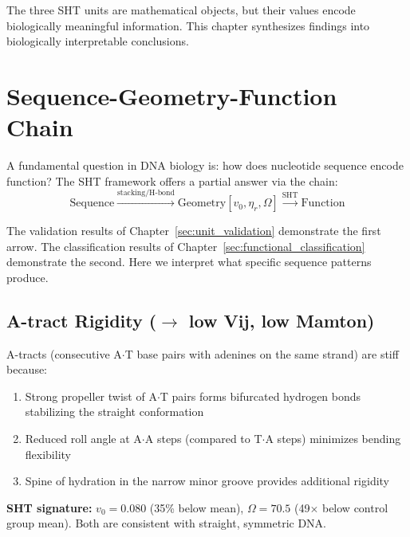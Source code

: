

The three SHT units are mathematical objects, but their values encode biologically meaningful information. This chapter synthesizes findings into biologically interpretable conclusions.

\section{Sequence-Geometry-Function Chain}

A fundamental question in DNA biology is: how does nucleotide sequence encode function? The SHT framework offers a partial answer via the chain:
\begin{equation}
    \text{Sequence} \xrightarrow{\text{stacking/H-bond}} \text{Geometry}[v_0, \eta_r, \Omega] \xrightarrow{\text{SHT}} \text{Function}
\end{equation}

The validation results of Chapter~\ref{sec:unit_validation} demonstrate the first arrow. The classification results of Chapter~\ref{sec:functional_classification} demonstrate the second. Here we interpret what specific sequence patterns produce.

\subsection{A-tract Rigidity ($\rightarrow$ low Vij, low Mamton)}

A-tracts (consecutive A$\cdot$T base pairs with adenines on the same strand) are stiff because:
\begin{enumerate}
    \item Strong propeller twist of A$\cdot$T pairs forms bifurcated hydrogen bonds stabilizing the straight conformation
    \item Reduced roll angle at A$\cdot$A steps (compared to T$\cdot$A steps) minimizes bending flexibility
    \item Spine of hydration in the narrow minor groove provides additional rigidity
\end{enumerate}

\textbf{SHT signature:} $v_0 = 0.080$ (35\% below mean), $\Omega = 70.5$ (49$\times$ below control group mean). Both are consistent with straight, symmetric DNA.

